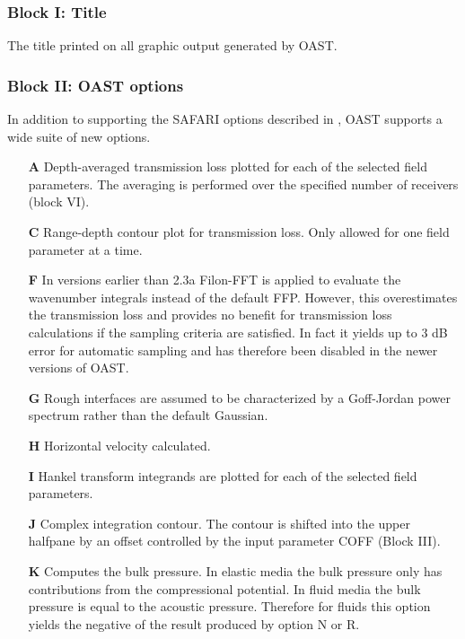 \subsubsection{Block I: Title}

The title printed on all graphic output generated by OAST.

\subsubsection{Block II: OAST options}

In addition to supporting the SAFARI options described in \cite{hs:saf}, 
OAST supports a wide suite of new options.
\begin{itemize}
	     \item[{\bf A}] Depth-averaged transmission loss plotted
		for each of the selected field parameters. 
		The averaging is performed over
		the specified number of receivers (block VI).
	     \item[{\bf C}] Range-depth contour plot for transmission
                loss. Only allowed for one field parameter
		at a time.
    \item[{\bf F}] In versions earlier than 2.3a  Filon-FFT is applied to evaluate the wavenumber
integrals instead of the default FFP. However, this overestimates the transmission loss and provides no benefit for transmission loss calculations if the sampling criteria are satisfied. In fact it yields up to 3 dB error for automatic sampling and has therefore been disabled in the newer versions of OAST.
    \item[{\bf G}] Rough interfaces are assumed to be characterized by
a Goff-Jordan power spectrum rather than the default Gaussian. 
	     \item[{\bf H}] Horizontal velocity calculated.
	     \item[{\bf I}] Hankel transform integrands are plotted
		for each of the selected field parameters.
	     \item[{\bf J}]	Complex integration contour. The contour is shifted
		into the upper halfpane by an offset controlled by the 
		input parameter COFF (Block III).
\item[{\bf K}]
      Computes the bulk pressure. In elastic media the bulk pressure only
      has contributions from the compressional potential. In fluid
      media the bulk pressure is equal to the acoustic pressure.
      Therefore for fluids this option yields the negative of the result
      produced by option N or R.  


\end{itemize}
